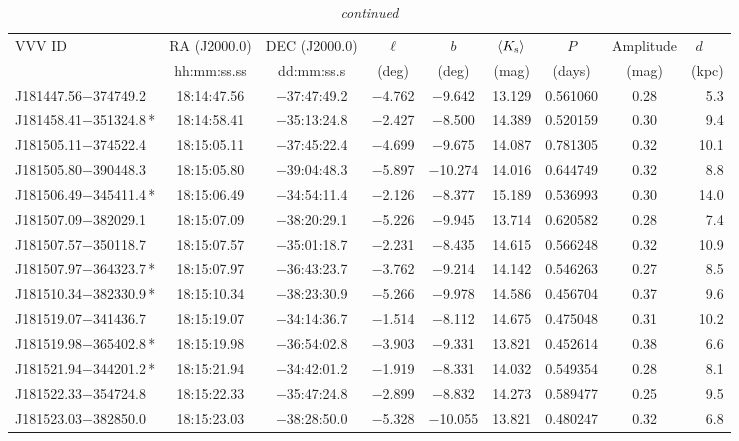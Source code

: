 \begin{table*}
\centering
\caption[]{{\it continued}}
\begin{tabular}{lcccccccr}
\hline \hline
VVV ID & RA (J2000.0)  & DEC (J2000.0) & $\ell$ & $b$ &  $\langle K_{\rm s} \rangle$ & $P$ & Amplitude & $d$~~~ \\
     & hh:mm:ss.ss    & dd:mm:ss.s   &  (deg) & (deg) &   (mag)       & (days) & (mag) & (kpc)   \\
\hline
J181447.56$-$374749.2 & 18:14:47.56 & $-$37:47:49.2 & $-$4.762 & $-$9.642 & 13.129 & 0.561060 & 0.28 & 5.3 \\
J181458.41$-$351324.8\,* & 18:14:58.41 & $-$35:13:24.8 & $-$2.427 & $-$8.500 & 14.389 & 0.520159 & 0.30 & 9.4 \\
J181505.11$-$374522.4 & 18:15:05.11 & $-$37:45:22.4 & $-$4.699 & $-$9.675 & 14.087 & 0.781305 & 0.32 & 10.1 \\
J181505.80$-$390448.3 & 18:15:05.80 & $-$39:04:48.3 & $-$5.897 & $-$10.274 & 14.016 & 0.644749 & 0.32 & 8.8 \\
J181506.49$-$345411.4\,* & 18:15:06.49 & $-$34:54:11.4 & $-$2.126 & $-$8.377 & 15.189 & 0.536993 & 0.30 & 14.0 \\
J181507.09$-$382029.1 & 18:15:07.09 & $-$38:20:29.1 & $-$5.226 & $-$9.945 & 13.714 & 0.620582 & 0.28 & 7.4 \\
J181507.57$-$350118.7 & 18:15:07.57 & $-$35:01:18.7 & $-$2.231 & $-$8.435 & 14.615 & 0.566248 & 0.32 & 10.9 \\
J181507.97$-$364323.7\,* & 18:15:07.97 & $-$36:43:23.7 & $-$3.762 & $-$9.214 & 14.142 & 0.546263 & 0.27 & 8.5 \\
J181510.34$-$382330.9\,* & 18:15:10.34 & $-$38:23:30.9 & $-$5.266 & $-$9.978 & 14.586 & 0.456704 & 0.37 & 9.6 \\
J181519.07$-$341436.7 & 18:15:19.07 & $-$34:14:36.7 & $-$1.514 & $-$8.112 & 14.675 & 0.475048 & 0.31 & 10.2 \\
J181519.98$-$365402.8\,* & 18:15:19.98 & $-$36:54:02.8 & $-$3.903 & $-$9.331 & 13.821 & 0.452614 & 0.38 & 6.6 \\
J181521.94$-$344201.2\,* & 18:15:21.94 & $-$34:42:01.2 & $-$1.919 & $-$8.331 & 14.032 & 0.549354 & 0.28 & 8.1 \\
J181522.33$-$354724.8 & 18:15:22.33 & $-$35:47:24.8 & $-$2.899 & $-$8.832 & 14.273 & 0.589477 & 0.25 & 9.5 \\
J181523.03$-$382850.0 & 18:15:23.03 & $-$38:28:50.0 & $-$5.328 & $-$10.055 & 13.821 & 0.480247 & 0.32 & 6.8 \\

\end{tabular}
\end{table*}
